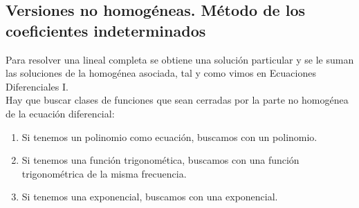 \subsection{Versiones no homogéneas. Método de los coeficientes indeterminados}
\noindent
Para resolver una lineal completa se obtiene una solución particular y se le suman las soluciones de la homogénea asociada, tal y como vimos en Ecuaciones Diferenciales I.\\

\noindent
Hay que buscar clases de funciones que sean cerradas por la parte no homogénea de la ecuación diferencial:
\begin{enumerate}
    \item Si tenemos un polinomio como ecuación, buscamos con un polinomio.
    \item Si tenemos una función trigonomética, buscamos con una función trigonométrica de la misma frecuencia.
    \item Si tenemos una exponencial, buscamos con una exponencial.
\end{enumerate}

